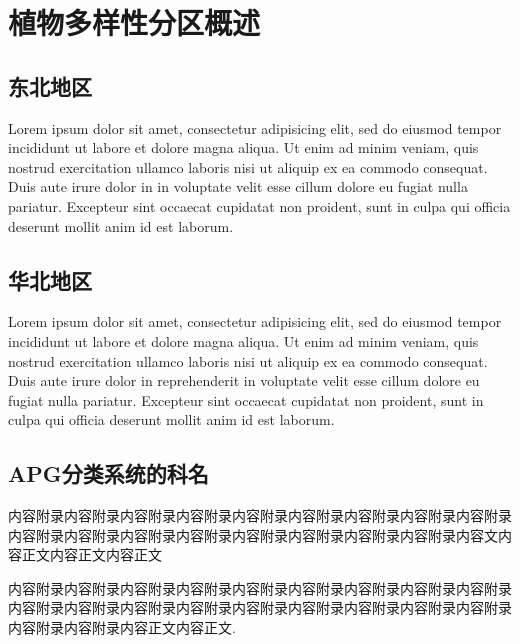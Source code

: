\documentclass[utf8]{book}
\begin{document}
\part{植物多样性分区概述}

\chapter{东北地区}

\begin{multicols}{2}
Lorem ipsum dolor sit amet, consectetur adipisicing elit, sed do eiusmod tempor incididunt ut labore et dolore magna aliqua. Ut enim ad minim veniam, quis nostrud exercitation ullamco laboris nisi ut aliquip ex ea commodo consequat. Duis aute irure dolor in  in voluptate velit esse cillum dolore eu fugiat nulla pariatur. Excepteur sint occaecat cupidatat non proident, sunt in culpa qui officia deserunt mollit anim id est laborum.
\end{multicols}

\chapter{华北地区}
\begin{multicols}{2}
Lorem ipsum dolor sit amet, consectetur adipisicing elit, sed do eiusmod tempor incididunt ut labore et dolore magna aliqua. Ut enim ad minim veniam, quis nostrud exercitation ullamco laboris nisi ut aliquip ex ea commodo consequat. Duis aute irure dolor in reprehenderit in voluptate velit esse cillum dolore eu fugiat nulla pariatur. Excepteur sint occaecat cupidatat non proident, sunt in culpa qui officia deserunt mollit anim id est laborum.
\end{multicols}



\appendix

\chapter{APG分类系统的科名}

内容附录内容附录内容附录内容附录内容附录内容附录内容附录内容附录内容附录内容附录内容附录内容附录内容附录内容附录内容附录内容附录内容附录内容文内容正文内容正文内容正文

内容附录内容附录内容附录内容附录内容附录内容附录内容附录内容附录内容附录内容附录内容附录内容附录内容附录内容附录内容附录内容附录内容附录内容附录内容附录内容附录内容正文内容正文\cite{DK1}.
\end{document}
